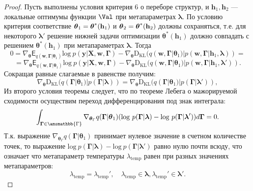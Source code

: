 \begin{proof}
Пусть выполнены условия критерия 6 о переборе структур, и $\mathbf{h}_1, \mathbf{h}_2$ --- локальные оптимумы функции $\Val$ при метапараметрах $\boldsymbol{\lambda}$.
По условию критерия соответствие $\boldsymbol{\theta}_1 = \boldsymbol{\theta}^{*}(\mathbf{h}_1)$ и $\boldsymbol{\theta}_2 = \boldsymbol{\theta}^{*}(\mathbf{h}_2)$ должны сохраняться, т.е. для некоторого $\boldsymbol{\lambda}'$ решение  нижней задачи оптимизации $\boldsymbol{\theta}^{*}(\mathbf{h}_1)$ должно совпадать с решением $\boldsymbol{\theta}^{*}(\mathbf{h}_1)$ при метапараметрах $\boldsymbol{\lambda}$. Тогда
\[
  0 =  \nabla_{\boldsymbol{\theta}} \mathsf{E}_{q(\mathbf{w}, \boldsymbol{\Gamma}|\boldsymbol{\theta}_1)} \text{log}~p(\mathbf{y}|\mathbf{X}, \mathbf{w}, \boldsymbol{\Gamma}) -\nabla_{\boldsymbol{\theta}}  \text{D}_{\text{KL}}(q(\mathbf{w}, \boldsymbol{\Gamma}|\boldsymbol{\theta}_1) | p(\mathbf{w}, \boldsymbol{\Gamma}|\mathbf{h}_1, \boldsymbol{\lambda})) = 
\]
\[
= \nabla_{\boldsymbol{\theta}} \mathsf{E}_{q(\mathbf{w}, \boldsymbol{\Gamma}|\boldsymbol{\theta}_1)} \text{log}~p(\mathbf{y}|\mathbf{X}, \mathbf{w}, \boldsymbol{\Gamma}) - \nabla_{\boldsymbol{\theta}}  \text{D}_{\text{KL}}(q(\mathbf{w}, \boldsymbol{\Gamma}|\boldsymbol{\theta}_1) | p(\mathbf{w}, \boldsymbol{\Gamma}|\mathbf{h}_1, \boldsymbol{\lambda}')).
\]
Сокращая равные слагаемые в равенстве получим:
\[
\nabla_{\boldsymbol{\theta}}  \text{D}_{\text{KL}}(q(\boldsymbol{\Gamma}|\boldsymbol{\theta}_1) | p(\boldsymbol{\Gamma}| \boldsymbol{\lambda})) = \nabla_{\boldsymbol{\theta}} \text{D}_{\text{KL}}(q(\boldsymbol{\Gamma}|\boldsymbol{\theta}_1) | p(\boldsymbol{\Gamma}| \boldsymbol{\lambda}')),
\] 
Из второго условия теоремы следует, что по теореме Лебега о мажорируемой сходимости осуществим переход дифференцирования под знак интеграла:
\[
\int_{\boldsymbol{\Gamma} \in \amsmathbb{\Gamma}} \nabla_{\boldsymbol{\theta}_\Gamma} q(\boldsymbol{\Gamma}|\boldsymbol{\theta}_1) (\text{log}~p(\boldsymbol{\Gamma}| \boldsymbol{\lambda}) - \text{log}~p(\boldsymbol{\Gamma}| \boldsymbol{\lambda}')) d\boldsymbol{\Gamma} = 0.
\]
Т.к. выражение $ \nabla_{\boldsymbol{\theta}_\Gamma} q(\boldsymbol{\Gamma}|\boldsymbol{\theta}_1)$ принимает нулевое значение в счетном количестве точек, то выражение $\text{log}~p(\boldsymbol{\Gamma}| \boldsymbol{\lambda}) - \text{log}~p(\boldsymbol{\Gamma}| \boldsymbol{\lambda}')$ равно нулю почти всюду, что означает что метапараметр температуры $\lambda_\text{temp}$  равен при разных значениях метапараметров:
\[
\lambda_\text{temp} = \lambda_\text{temp}',\quad \lambda_\text{temp} \in \boldsymbol{\lambda}, \lambda_\text{temp}' \in \boldsymbol{\lambda}'.
\]
\end{proof}

